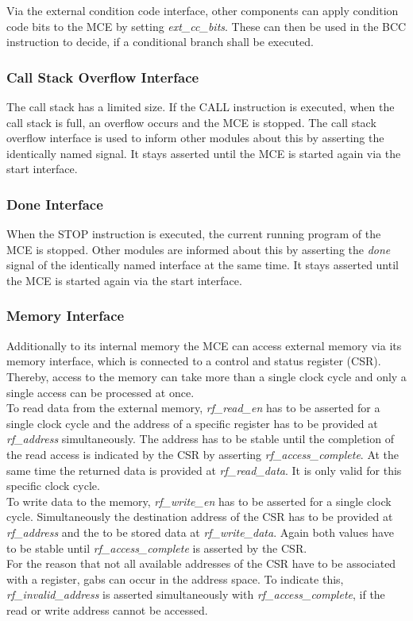 Via the external condition code interface, other components can apply condition code bits to the MCE by setting \emph{ext\_cc\_bits}.
These can then be used in the BCC instruction to decide, if a conditional branch shall be executed.

\subsubsection{Call Stack Overflow Interface}

The call stack has a limited size.
If the CALL instruction is executed, when the call stack is full, an overflow occurs and the MCE is stopped.
The call stack overflow interface is used to inform other modules about this by asserting the identically named signal.
It stays asserted until the MCE is started again via the start interface.

\subsubsection{Done Interface}

When the STOP instruction is executed, the current running program of the MCE is stopped.
Other modules are informed about this by asserting the \emph{done} signal of the identically named interface at the same time.
It stays asserted until the MCE is started again via the start interface.

\subsubsection{Memory Interface}\label{mem_inf}

Additionally to its internal memory the MCE can access external memory via its memory interface, which is connected to a control and status register (CSR).
Thereby, access to the memory can take more than a single clock cycle and only a single access can be processed at once.\\
To read data from the external memory, \emph{rf\_read\_en} has to be asserted for a single clock cycle and the address of a specific register has to be provided at \emph{rf\_address} simultaneously.
The address has to be stable until the completion of the read access is indicated by the CSR by asserting \emph{rf\_access\_complete}.
At the same time the returned data is provided at \emph{rf\_read\_data}.
It is only valid for this specific clock cycle.\\
To write data to the memory, \emph{rf\_write\_en} has to be asserted for a single clock cycle.
Simultaneously the destination address of the CSR has to be provided at \emph{rf\_address} and the to be stored data at \emph{rf\_write\_data}.
Again both values have to be stable until \emph{rf\_access\_complete} is asserted by the CSR.\\
For the reason that not all available addresses of the CSR have to be associated with a register, gabs can occur in the address space.
To indicate this, \emph{rf\_invalid\_address} is asserted simultaneously with \emph{rf\_access\_complete}, if the read or write address cannot be accessed.



